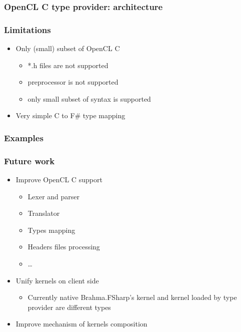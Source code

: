 \documentclass[xcolor=table]{beamer}
\begin{document}
\begin{frame}
  \transwipe[direction=90]
  \frametitle{OpenCL C type provider: architecture}
    
  \pause
\end{frame}

\begin{frame}
  \transwipe[direction=90]
  \frametitle{Limitations}
\begin{itemize}
\item Only (small) subset of OpenCL C
 \begin{itemize}
 \item *.h files are not supported
 \item preprocessor is not supported
 \item only small subset of syntax is supported
  \end{itemize}
\item Very simple C to F\# type mapping
\end{itemize}

\end{frame}

            
\begin{frame}
  \transwipe[direction=90]
  \frametitle{Examples}         

\end{frame}     

\begin{frame}
  \transwipe[direction=90]
  \frametitle{Future work}         
\begin{itemize}
\item Improve OpenCL C support
\begin{itemize}
\item Lexer and parser
\item Translator 
\item Types mapping
\item Headers files processing
\item \dots
\end{itemize}
\item Unify kernels on client side
\begin{itemize}
\item Currently native Brahma.FSharp's kernel and kernel loaded by type provider are different 
types
\end{itemize}
\item Improve mechanism of kernels composition
\end{itemize}
\end{frame}     
            
\end{document}
